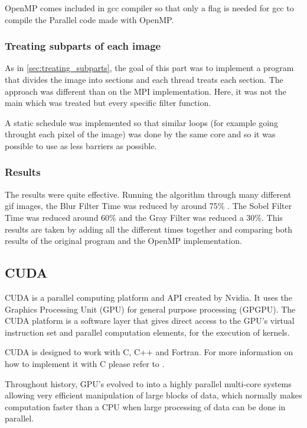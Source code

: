 \documentclass[conference,compsoc]{IEEEtran}
\begin{document}
OpenMP comes included in gcc compiler so that only a flag is needed for gcc to compile the Parallel code made with OpenMP.

\subsubsection{Treating subparts of each image}
As in \ref{sec:treating_subparts}, the goal of this part was to implement a program that divides the image into sections and each thread treats each section. The approach was different than on the MPI implementation. Here, it was not the main which was treated but every specific filter function.

A static schedule was implemented so that similar loops (for example going throught each pixel of the image) was done by the same core and so it was possible to use as less barriers as possible.

\subsubsection{Results} \label{sec:results}
The results were quite effective. Running the algorithm through many different gif images, the Blur Filter Time was reduced by around 75\% . The Sobel Filter Time was reduced around 60\% and the Gray Filter was reduced a 30\%. This results are taken by adding all the different times together and comparing both results of the original program and the OpenMP implementation.

\subsection{CUDA}\label{sec:CUDA}

CUDA is a parallel computing platform and API created by Nvidia. It uses the Graphics Processing Unit (GPU) for general purpose processing (GPGPU). The CUDA platform is a software layer that gives direct access to the GPU's virtual instruction set and parallel computation elements, for the execution of kernels.

CUDA is designed to work with C, C++ and Fortran. For more information on how to implement it with C please refer to \cite{CUDACPROGRAMMINGGUIDE}.

Throughout history, GPU's evolved to into a highly parallel multi-core systems allowing very efficient manipulation of large blocks of data, which normally makes computation faster than a CPU when large processing of data can be done in parallel.
\end{document}
